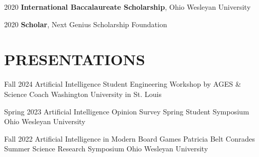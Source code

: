 \documentclass[10pt, letterpaper]{article}
\begin{document}
\begin{honorentry}
  {2020} %
  {\textbf{International Baccalaureate Scholarship}, Ohio Wesleyan University} %
\end{honorentry}

\begin{honorentry}
  {2020} %
  {\textbf{Scholar}, Next Genius Scholarship Foundation} %
\end{honorentry}

\vspace{\headerSpacing}

\section{PRESENTATIONS}

\begin{presentationentry}
  {Fall 2024} %
  {Artificial Intelligence} %
  {Student Engineering Workshop by AGES \& Science Coach} %
  {Washington University in St. Louis} %
\end{presentationentry}

\begin{presentationentry}
  {Spring 2023} %
  {Artificial Intelligence Opinion Survey} %
  {Spring Student Symposium} %
  {Ohio Wesleyan University} %
\end{presentationentry}

\begin{presentationentry}
  {Fall 2022} %
  {Artificial Intelligence in Modern Board Games} %
  {Patricia Belt Conrades Summer Science Research Symposium} %
  {Ohio Wesleyan University} %
\end{presentationentry}

\vspace{\headerSpacing}
\end{document}
